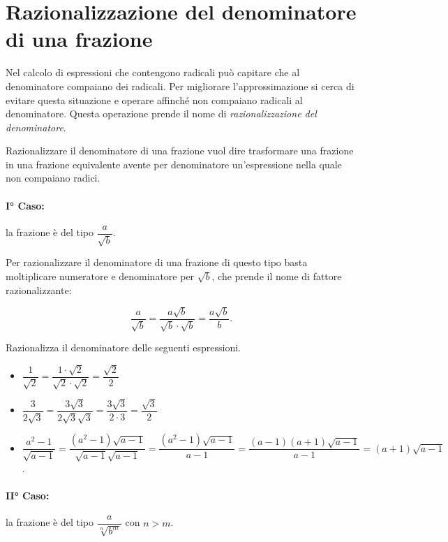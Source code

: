 
\section{Razionalizzazione del denominatore di una frazione}
\label{sec:02_razionalizzazione}

Nel calcolo di espressioni che contengono radicali può capitare che al 
denominatore compaiano dei radicali. 
Per migliorare l'approssimazione si cerca di evitare questa situazione e 
operare affinché non compaiano radicali al denominatore. 
Questa operazione prende il nome di \emph{razionalizzazione del denominatore}.

Razionalizzare il denominatore di una frazione vuol dire trasformare una 
frazione in una frazione equivalente avente per denominatore un'espressione 
nella quale non compaiano radici.

\paragraph{I° Caso:} la frazione è del tipo $\dfrac a{\sqrt b}$.

Per razionalizzare il denominatore di una frazione di questo tipo basta 
moltiplicare numeratore e denominatore per $\sqrt b$, che prende il nome di 
fattore razionalizzante: 

\[\dfrac {a} {\sqrt b} = \dfrac{a\sqrt b}{\sqrt b\cdot \sqrt b}=
  \dfrac{a\sqrt b}b.\]

\begin{exrig}
 \begin{esempio}
Razionalizza il denominatore delle seguenti espressioni.
\begin{itemize}
 \item $\dfrac 1{\sqrt 2}=\dfrac{1\cdot \sqrt 2}{\sqrt 2\cdot \sqrt 2}=
        \dfrac{\sqrt 2} 2$
 \item $\dfrac 3{2\sqrt 3}=\dfrac{3\sqrt 3}{2\sqrt 3\sqrt 3}=
        \dfrac{3\sqrt 3}{2\cdot 3}=\dfrac{\sqrt 3} 2$
 \item $\dfrac{a^2-1}{\sqrt{a-1}}=
        \dfrac{(a^2-1)\sqrt{a-1}}{\sqrt{a-1}\sqrt{a-1}}=
        \dfrac{(a^2-1)\sqrt{a-1}}{a-1}=
        \dfrac{(a-1)(a+1)\sqrt{a-1}}{a-1}=(a+1)\sqrt{a-1}$.
\end{itemize}
 \end{esempio}
\end{exrig}

\paragraph{II° Caso:}
 la frazione è del tipo $\dfrac a{\sqrt[n]{b^m}}$ con $n>m$.

